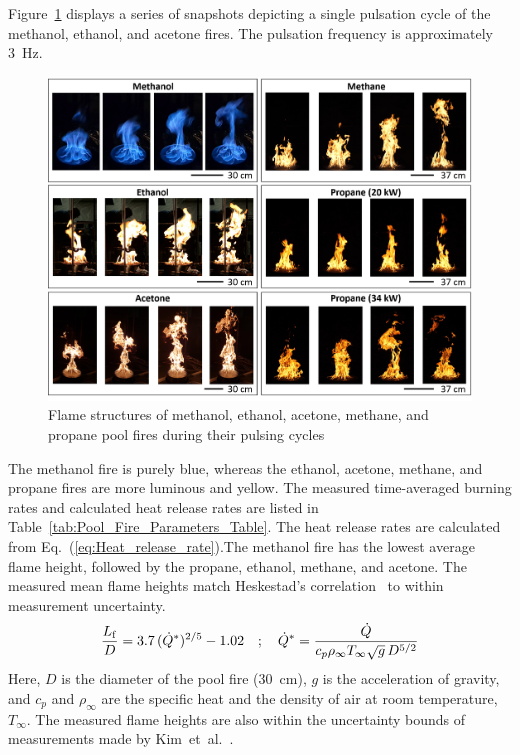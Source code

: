 \documentclass[12pt]{article}
\begin{document}
Figure~\ref{fig:Flame_Structure} displays a series of snapshots depicting a single pulsation cycle of the methanol, ethanol, and acetone fires. The pulsation frequency is approximately 3~Hz.
\begin{figure}
	\centering
\includegraphics[width=\textwidth,keepaspectratio]{Flame_Structure.png}
	\caption[Photographs of the three fires]{Flame structures of methanol, ethanol, acetone, methane, and propane pool fires during their pulsing cycles}
	\label{fig:Flame_Structure}
\end{figure}
The methanol fire is purely blue, whereas the ethanol, acetone, methane, and propane fires are more luminous and yellow. The measured time-averaged burning rates and calculated heat release rates are listed in Table~\ref{tab:Pool_Fire_Parameters_Table}. The heat release rates are calculated from Eq.~(\ref{eq:Heat_release_rate}).The methanol fire has the lowest average flame height, followed by the propane, ethanol, methane, and acetone. The measured mean flame heights match Heskestad’s correlation~\cite{Heskestad1983} to within measurement uncertainty.
\begin{equation}
\frac{L_{\rm f}}{D} = 3.7 \, (\dot{Q}^*)^{2/5} - 1.02 \quad ; \quad \dot{Q}^*=\frac{\dot{Q}}{c_{p}\rho_\infty T_\infty \sqrt{g} \, D^{5/2}}
\end{equation}
Here, $D$ is the diameter of the pool fire (30~cm), $g$ is the acceleration of gravity, and $c_p$ and $\rho_\infty$ are the specific heat and the density of air at room temperature, $T_\infty$. The measured flame heights are also within the uncertainty bounds of measurements made by Kim~et~al.~\cite{Kim2019}.
\end{document}
